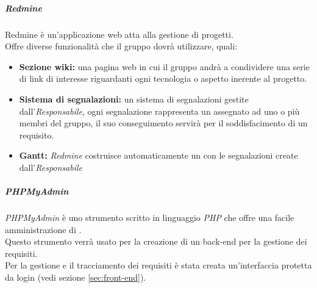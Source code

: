 \documentclass{scalatekids-article}
\begin{document}
\subparagraph{Redmine}
Redmine è un'applicazione web atta alla gestione di progetti.\\
Offre diverse funzionalità che il gruppo dovrà utilizzare, quali:
\begin{itemize}
\item\textbf{Sezione wiki:} una pagina web in cui il gruppo andrà a condividere una serie di link di interesse riguardanti ogni tecnologia o aspetto inerente al progetto.
\item\textbf{Sistema di segnalazioni:} un sistema di segnalazioni gestite dall'\textit{Responsabile}, ogni segnalazione rappresenta un  assegnato ad uno o più membri del gruppo, il suo conseguimento servirà per il soddisfacimento di un requisito.
\item\textbf{Gantt:} \textit{Redmine} costruisce automaticamente un  con le segnalazioni create dall'\textit{Responsabile}
\end{itemize}

\subparagraph{PHPMyAdmin}
\textit{PHPMyAdmin} è uno strumento scritto in linguaggio \textit{PHP} che offre una facile amministrazione di \textit{}.\\
Questo strumento verrà usato per la creazione di un back-end per la gestione dei requisiti.\\
Per la gestione e il tracciamento dei requisiti è stata creata un'interfaccia protetta da login (vedi sezione \ref{sec:front-end}).
\end{document}

